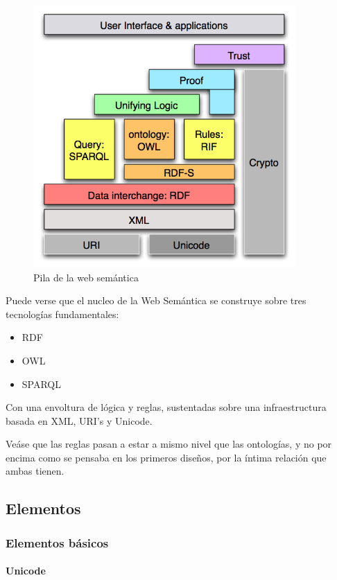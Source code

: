\begin{figure}[H]
	\centering
	\includegraphics[width=10cm]{images/semantic-web-stack.png}
	\caption{Pila de la web semántica}
	\label{fig:swStack}
\end{figure}

Puede verse que el nucleo de la Web Semántica se construye sobre tres 
tecnologías fundamentales:

\begin{itemize}
  \item RDF
  \item OWL
  \item SPARQL
\end{itemize}

Con una envoltura de lógica y reglas, sustentadas sobre una infraestructura 
basada en XML, URI's y Unicode.

Veáse que las reglas pasan a estar a mismo nivel que las ontologías, y no por
encima como se pensaba en los primeros diseños, por la íntima relación que ambas
tienen.

\subsection{Elementos}

\subsubsection{Elementos básicos}

\paragraph{Unicode}

